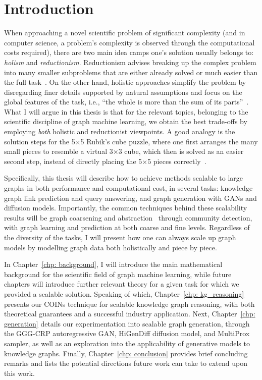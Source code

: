 \chapter{Introduction}
\label{chp: introduction}

When approaching a novel scientific problem of significant complexity (and in computer science, a problem's complexity is observed through the computational costs required), there are two main idea camps one's solution usually belongs to: \emph{holism} and \emph{reductionism}. Reductionism advises breaking up the complex problem into many smaller subproblems that are either already solved or much easier than the full task~\cite{doniger_merriam-websters_1999, kricheldorf_getting_2016}. On the other hand, holistic approaches simplify the problem by disregarding finer details supported by natural assumptions and focus on the global features of the task, i.e., \enquote{the whole is more than the sum of its parts}~\cite{marshall_unity_2002, noauthor_what_2022}. What I will argue in this thesis is that for the relevant topics, belonging to the scientific discipline of graph machine learning, we obtain the best trade-offs by employing \emph{both} holistic and reductionist viewpoints. A good analogy is the solution steps for the 5$\times$5 Rubik's cube puzzle, where one first arranges the many small pieces to resemble a virtual 3$\times$3 cube, which then is solved as an easier second step, instead of directly placing the 5$\times$5 pieces correctly~\cite{guangzhou_ganyuan_intelligent_technology_co_ltd_5x5_nodate}.

Specifically, this thesis will describe how to achieve methods scalable to large graphs in both performance and computational cost, in several tasks: knowledge graph link prediction and query answering, and graph generation with GANs and diffusion models. Importantly, the common techniques behind these scalability results will be graph coarsening and abstraction~\cite{boneva_graph_2007}  through community detection, with graph learning and prediction at both coarse and fine levels. Regardless of the diversity of the tasks, I will present how one can always scale up graph models by modelling graph data both holistically and piece by piece.

In Chapter~\ref{chp: background}, I will introduce the main mathematical background for the scientific field of graph machine learning, while future chapters will introduce further relevant theory for a given task for which we provided a scalable solution. Speaking of which, Chapter~\ref{chp: kg_reasoning} presents our COINs technique for scalable knowledge graph reasoning, with both theoretical guarantees and a successful industry application. Next, Chapter~\ref{chp: generation} details our experimentation into scalable graph generation, through the GGG-CRP autoregressive GAN, HiGenDiff diffusion model, and MultiProx sampler, as well as an exploration into the applicability of generative models to knowledge graphs. Finally, Chapter~\ref{chp: conclusion} provides brief concluding remarks and lists the potential directions future work can take to extend upon this work.